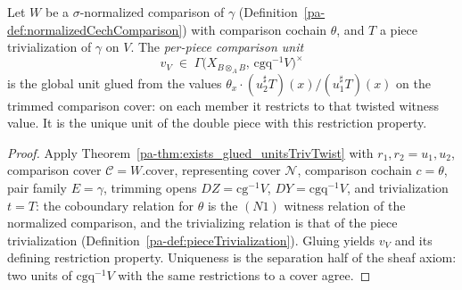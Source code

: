 \begin{theorem}
  \label{pa-thm:pieceComparisonUnit}
  \leanok

  Let \(W\) be a \(\sigma\)-normalized comparison of \(\gamma\)
  (Definition~\ref{pa-def:normalizedCechComparison}) with comparison cochain \(\theta\), and \(T\) a
  piece trivialization of \(\gamma\) on \(V\). The \emph{per-piece comparison unit}
  \[
    v_V \;\in\; \Gamma\bigl(X_{B \otimes_A B},\, \mathrm{cgq}^{-1}V\bigr)^{\times}
  \]
  is the global unit glued from the values \(\theta_x \cdot (u_2^{\sharp}T)(x) /
  (u_1^{\sharp}T)(x)\) on the trimmed comparison cover: on each member it restricts to that twisted
  witness value. It is the unique unit of the double piece with this restriction property.
\end{theorem}
\begin{proof}
  \leanok
  Apply Theorem~\ref{pa-thm:exists_glued_unitsTrivTwist} with \(r_1, r_2 = u_1, u_2\), comparison
  cover \(\mathcal C = W.\mathrm{cover}\), representing cover \(\mathcal N\), comparison cochain
  \(c = \theta\), pair family \(E = \gamma\), trimming opens \(DZ = \mathrm{cg}^{-1}V\), \(DY =
  \mathrm{cgq}^{-1}V\), and trivialization \(t = T\): the coboundary relation for \(\theta\) is the
  \((N1)\) witness relation of the normalized comparison, and the trivializing relation is that of
  the piece trivialization (Definition~\ref{pa-def:pieceTrivialization}). Gluing yields \(v_V\) and its
  defining restriction property. Uniqueness is the separation half of the sheaf axiom: two units of
  \(\mathrm{cgq}^{-1}V\) with the same restrictions to a cover agree.
\end{proof}

